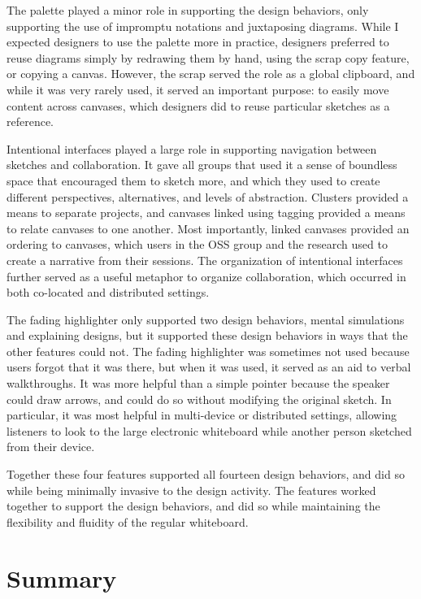 The palette played a minor role in supporting the design behaviors, only supporting the use of impromptu notations and juxtaposing diagrams. While I expected designers to use the palette more in practice, designers preferred to reuse diagrams simply by redrawing them by hand, using the scrap copy feature, or copying a canvas. However, the scrap served the role as a global clipboard, and while it was very rarely used, it served an important purpose: to easily move content across canvases, which designers did to reuse particular sketches as a reference.

Intentional interfaces played a large role in supporting navigation between sketches and collaboration. It gave all groups that used it a sense of boundless space that encouraged them to sketch more, and which they used to create different perspectives, alternatives, and levels of abstraction. Clusters provided a means to separate projects, and canvases linked using tagging provided a means to relate canvases to one another. Most importantly, linked canvases provided an ordering to canvases, which users in the OSS group and the research used to create a narrative from their sessions. The organization of intentional interfaces further served as a useful metaphor to organize collaboration, which occurred in both co-located and distributed settings.

The fading highlighter only supported two design behaviors, mental simulations and explaining designs, but it supported these design behaviors in ways that the other features could not. The fading highlighter was sometimes not used because users forgot that it was there, but when it was used, it served as an aid to verbal walkthroughs. It was more helpful than a simple pointer because the speaker could draw arrows, and could do so without modifying the original sketch. In particular, it was most helpful in multi-device or distributed settings, allowing listeners to look to the large electronic whiteboard while another person sketched from their device. 

Together these four features supported all fourteen design behaviors, and did so while being minimally invasive to the design activity. The features worked together to support the design behaviors, and did so while maintaining the flexibility and fluidity of the regular whiteboard. 

\section{Summary}

